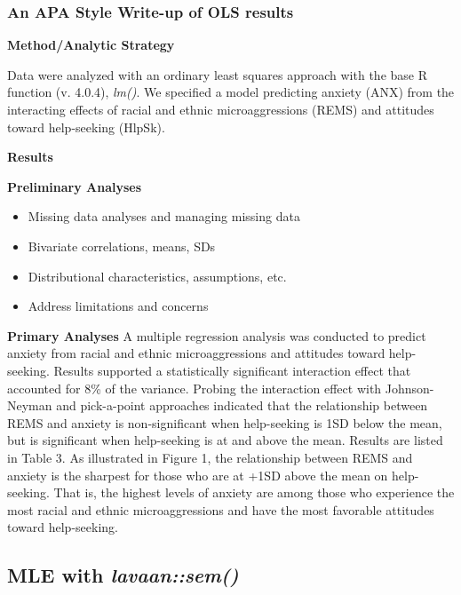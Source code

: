 \documentclass[
]{book}
\providecommand{\tightlist}{%
  \setlength{\itemsep}{0pt}\setlength{\parskip}{0pt}}
\begin{document}
\hypertarget{an-apa-style-write-up-of-ols-results}{%
\subsubsection{An APA Style Write-up of OLS results}\label{an-apa-style-write-up-of-ols-results}}

\textbf{Method/Analytic Strategy}

Data were analyzed with an ordinary least squares approach with the base R function (v. 4.0.4), \emph{lm()}. We specified a model predicting anxiety (ANX) from the interacting effects of racial and ethnic microaggressions (REMS) and attitudes toward help-seeking (HlpSk).

\textbf{Results}

\textbf{Preliminary Analyses}

\begin{itemize}
\tightlist
\item
  Missing data analyses and managing missing data
\item
  Bivariate correlations, means, SDs
\item
  Distributional characteristics, assumptions, etc.
\item
  Address limitations and concerns
\end{itemize}

\textbf{Primary Analyses}
A multiple regression analysis was conducted to predict anxiety from racial and ethnic microaggressions and attitudes toward help-seeking. Results supported a statistically significant interaction effect that accounted for 8\% of the variance. Probing the interaction effect with Johnson-Neyman and pick-a-point approaches indicated that the relationship between REMS and anxiety is non-significant when help-seeking is 1SD below the mean, but is significant when help-seeking is at and above the mean. Results are listed in Table 3. As illustrated in Figure 1, the relationship between REMS and anxiety is the sharpest for those who are at +1SD above the mean on help-seeking. That is, the highest levels of anxiety are among those who experience the most racial and ethnic microaggressions and have the most favorable attitudes toward help-seeking.

\hypertarget{mle-with-lavaansem}{%
\subsection{\texorpdfstring{MLE with \emph{lavaan::sem()}}{MLE with lavaan::sem()}}\label{mle-with-lavaansem}}
\end{document}
